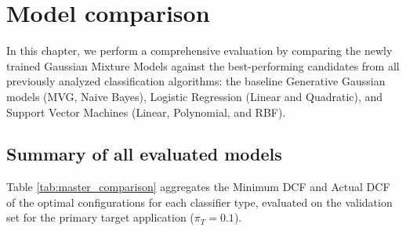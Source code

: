 \chapter{Model comparison}
\label{chap:historical_comparison}

In this chapter, we perform a comprehensive evaluation by comparing the newly trained Gaussian Mixture Models against the best-performing candidates from all previously analyzed classification algorithms: the baseline Generative Gaussian models (MVG, Naive Bayes), Logistic Regression (Linear and Quadratic), and Support Vector Machines (Linear, Polynomial, and RBF).

\section{Summary of all evaluated models}

Table \ref{tab:master_comparison} aggregates the Minimum DCF and Actual DCF of the optimal configurations for each classifier type, evaluated on the validation set for the primary target application ($\pi_T = 0.1$).


